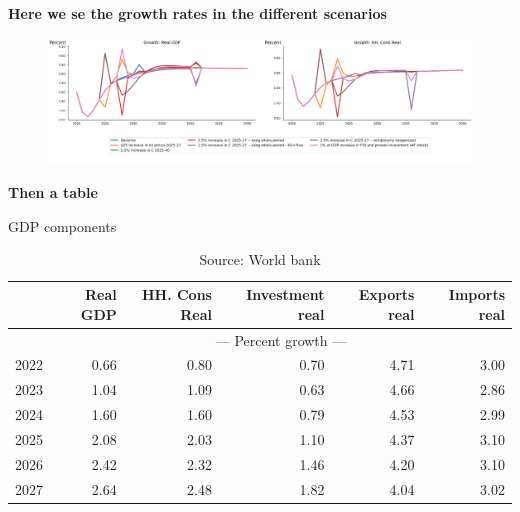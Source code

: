 \documentclass{article}
\begin{document}
\textbf{Here we se the growth rates in the different scenarios}

 
\begin{figure}[htbp]
\centering
\includegraphics[width=\textwidth]{"../My_first_plot/My_first_plot.png"}
\caption{}
\end{figure} 

\textbf{Then a table}

\begin{table}[ht]
\caption{GDP components}
\begin{tabular}{lrrrrr}
\toprule
 & Real GDP & HH. Cons Real & Investment real & Exports real & Imports real \\
\midrule
&\multicolumn{5}{c}{{--- Percent growth ---}}\\
2022 & 0.66 & 0.80 & 0.70 & 4.71 & 3.00 \\
2023 & 1.04 & 1.09 & 0.63 & 4.66 & 2.86 \\
2024 & 1.60 & 1.60 & 0.79 & 4.53 & 2.99 \\
2025 & 2.08 & 2.03 & 1.10 & 4.37 & 3.10 \\
2026 & 2.42 & 2.32 & 1.46 & 4.20 & 3.10 \\
2027 & 2.64 & 2.48 & 1.82 & 4.04 & 3.02 \\
\bottomrule
\end{tabular}
\caption*{Source: World bank }
\end{table}
\end{document}
